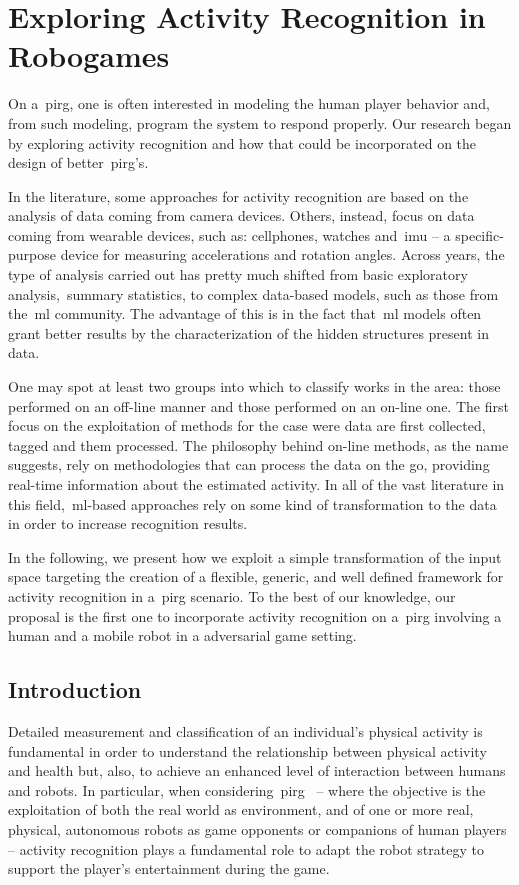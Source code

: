 \chapter{Exploring Activity Recognition in Robogames}\label{ch:activity}

On a~\gls{pirg}, one is often interested in modeling the human player behavior and, from such modeling, program the system to respond properly. Our research began by exploring activity recognition and how that could be incorporated on the design of better~\gls{pirg}'s. 

In the literature, some approaches for activity recognition are based on the analysis of data coming from camera devices. Others, instead, focus on data coming from wearable devices, such as: cellphones, watches and~\gls{imu} -- a specific-purpose device for measuring accelerations and rotation angles. Across years, the type of analysis carried out has pretty much shifted from basic exploratory analysis,~\eg summary statistics, to complex data-based models, such as those from the~\gls{ml} community. The advantage of this is in the fact that~\gls{ml} models often grant better results by the characterization of the hidden structures present in data.

One may spot at least two groups into which to classify works in the area: those performed on an off-line manner and those performed on an on-line one. The first focus on the exploitation of methods for the case were data are first collected, tagged and them processed. The philosophy behind on-line methods, as the name suggests, rely on methodologies that can process the data on the go, providing real-time information about the estimated activity. In all of the vast literature in this field,~\gls{ml}-based approaches rely on some kind of transformation to the data in order to increase recognition results.

In the following, we present how we exploit a simple transformation of the input space targeting the creation of a flexible, generic, and well defined framework for activity recognition in a~\gls{pirg} scenario. To the best of our knowledge, our proposal is the first one to incorporate activity recognition on a~\glsdesc{pirg} involving a human and a mobile robot in a adversarial game setting.

\section{Introduction}

Detailed measurement and classification of an individual's physical  activity is fundamental in order to understand the relationship between physical activity and health but, also, to achieve an enhanced level of interaction between humans and robots. In particular, when considering~\glsdesc{pirg}~\cite{martinoia_physically_2013} -- where the objective is the exploitation of both the real world as environment, and of one or more real, physical, autonomous robots as game opponents or companions of human players -- activity recognition plays a fundamental role to adapt the robot strategy to support the player's entertainment during the game.

